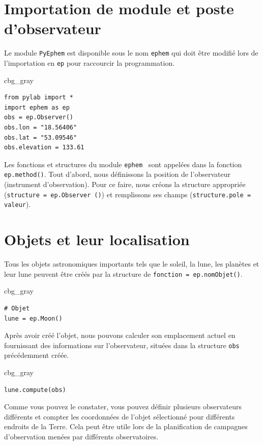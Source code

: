 \documentclass[%
oneside,                 %
final,                   %
10pt,french]{article}
\newenvironment{_cod_tight}[1]{
   \def\FrameCommand{\colorbox{#1}}
   \FrameRule0.6pt\MakeFramed {\FrameRestore}\vskip3mm}
   {\vskip0mm\endMakeFramed}
\newenvironment{cod}[1]{
\bgroup\rmfamily
\fboxsep=0mm\relax
\begin{_cod_tight}{#1}
\list{}{\parsep=-2mm\parskip=0mm\topsep=0pt\leftmargin=2mm
\rightmargin=2\leftmargin\leftmargin=4pt\relax}
\item\relax}
{\endlist\end{_cod_tight}\egroup}
\begin{document}
\section{Importation de module et poste d'observateur}
Le module \texttt{PyEphem} est disponible sous le nom \texttt{ephem} qui doit être modifié lors de l’importation en \texttt{ep} pour raccourcir la programmation.
\begin{cod}{cbg_gray}\begin{verbatim}
from pylab import *
import ephem as ep
obs = ep.Observer()
obs.lon = "18.56406"
obs.lat = "53.09546"
obs.elevation = 133.61
\end{verbatim}
\end{cod}
\noindent
Les fonctions et structures du module \texttt{ephem } sont appelées dans la fonction \texttt{ep.method()}. Tout d'abord, nous définissons la position de l'observateur (instrument d'observation). Pour ce faire, nous créons la structure appropriée (\texttt{structure = ep.Observer ()}) et remplissons ses champs (\texttt{structure.pole = valeur}).

\section{Objets et leur localisation}
Tous les objets astronomiques importants tels que le soleil, la lune, les planètes et leur lune peuvent être créés par la structure de \texttt{fonction = ep.nomObjet()}.
\begin{cod}{cbg_gray}\begin{verbatim}
# Objet
lune = ep.Moon()
\end{verbatim}
\end{cod}
\noindent
Après avoir créé l'objet, nous pouvons calculer son emplacement actuel en fournissant des informations sur l'observateur, situées dans la structure \texttt{obs} précédemment créée.
\begin{cod}{cbg_gray}\begin{verbatim}
lune.compute(obs)
\end{verbatim}
\end{cod}
\noindent
Comme vous pouvez le constater, vous pouvez définir plusieurs observateurs différents et compter les coordonnées de l'objet sélectionné pour différents endroits de la Terre. Cela peut être utile lors de la planification de campagnes d’observation menées par différents observatoires.
\end{document}
